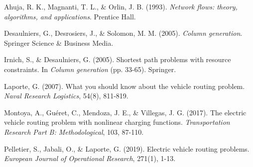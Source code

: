 \documentclass[12pt,a4paper]{article}
\begin{document}

\begin{thebibliography}{99}

Ahuja, R. K., Magnanti, T. L., \& Orlin, J. B. (1993). 
\textit{Network flows: theory, algorithms, and applications}. 
Prentice Hall.

Desaulniers, G., Desrosiers, J., \& Solomon, M. M. (2005). 
\textit{Column generation}. 
Springer Science \& Business Media.

Irnich, S., \& Desaulniers, G. (2005). 
Shortest path problems with resource constraints. 
In \textit{Column generation} (pp. 33-65). Springer.

Laporte, G. (2007). 
What you should know about the vehicle routing problem. 
\textit{Naval Research Logistics}, 54(8), 811-819.

Montoya, A., Guéret, C., Mendoza, J. E., \& Villegas, J. G. (2017). 
The electric vehicle routing problem with nonlinear charging functions. 
\textit{Transportation Research Part B: Methodological}, 103, 87-110.

Pelletier, S., Jabali, O., \& Laporte, G. (2019). 
Electric vehicle routing problems. 
\textit{European Journal of Operational Research}, 271(1), 1-13.

\end{thebibliography}
\end{document}
